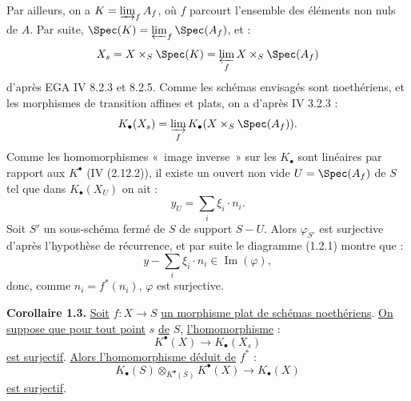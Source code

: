 
Par
ailleurs, on a $K=\varinjlim_f A_f$, où $f$ parcourt l'ensemble des éléments non nuls de $A$. Par suite, $\Spec(K)=\varprojlim_f\Spec(A_f)$, et :
\[
X_s=X\times_S\Spec(K)=\varprojlim_f X\times_S\Spec(A_f)
\]
d'après EGA IV 8.2.3 et 8.2.5. Comme les schémas envisagés sont noethériens, et les morphismes de transition affines et plats, on a d'après IV 3.2.3 :
\[
K_\bullet(X_s)=\varinjlim_f K_\bullet(X\times_S\Spec(A_f)).
\]
Comme les homomorphismes «~image inverse~» sur les $K_\bullet$ sont linéaires par rapport aux $K^{\bullet}$ (IV (2.12.2)), il existe un ouvert non vide $U=\Spec(A_f)$ de $S$ tel que dans $K_\bullet(X_U)$ on ait :
\[
y_U=\sum_i\xi_i\cdot n_i.
\]
Soit $S'$ un sous-schéma fermé de $S$ de support $S-U$. Alors $\varphi_{S'}$ est surjective d'après l'hypothèse de récurrence, et par suite le diagramme (1.2.1) montre que :
\[
y-\sum_i\xi_i\cdot n_i\in \operatorname{Im}(\varphi),
\]
donc, comme $n_i=f^*(n_i)$, $\varphi$ est surjective.

\textbf{Corollaire 1.3.} \uline{Soit} $f:X\to S$ \uline{un morphisme plat de schémas noethériens}. \uline{On suppose que pour tout point} $s$ \uline{de} $S$, \uline{l'homomorphisme} :
\[
K^{\bullet}(X)\longrightarrow K_\bullet(X_s)
\]
\uline{est surjectif}. \uline{Alors l'homomorphisme déduit de} $f^*$ :
\[
K_\bullet(S)\otimes_{K^{\bullet}(S)}K^{\bullet}(X)\longrightarrow K_\bullet(X)
\]
\uline{est surjectif}.

